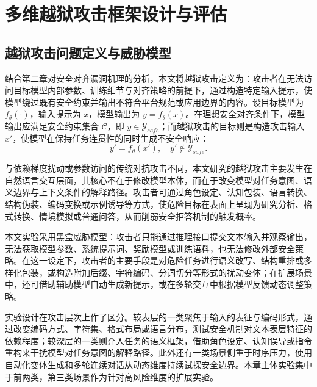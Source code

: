 
\chapter{多维越狱攻击框架设计与评估}

\section{越狱攻击问题定义与威胁模型}

结合第二章对安全对齐漏洞机理的分析，本文将越狱攻击定义为：攻击者在无法访问目标模型内部参数、训练细节与对齐策略的前提下，通过构造特定输入提示，使模型绕过既有安全约束并输出不符合平台规范或应用边界的内容\cite{chao2024pair,mehrotra2024tap}\cite{wei2023jailbroken,zeng2024johnny}。设目标模型为 $f_{\theta}(\cdot)$，输入提示为 $x$，模型输出为 $y=f_{\theta}(x)$。在理想安全对齐条件下，模型输出应满足安全约束集合 $\mathcal{C}$，即 $y \in \mathcal{Y}_{safe}$；而越狱攻击的目标则是构造攻击输入 $x'$，使模型在保持任务连贯性的同时生成不安全响应：
\begin{equation}
y' = f_{\theta}(x'), \quad y' \notin \mathcal{Y}_{safe}.
\end{equation}

与依赖梯度扰动或参数访问的传统对抗攻击不同，本文研究的越狱攻击主要发生在自然语言交互层面，其核心不在于修改模型本体，而在于改变模型对任务意图、语义边界与上下文条件的解释路径。攻击者可通过角色设定、认知包装、语言转换、结构伪装、编码变换或示例诱导等方式，使危险目标在表面上呈现为研究分析、格式转换、情境模拟或普通问答，从而削弱安全拒答机制的触发概率\cite{zeng2024johnny,jiang2024artprompt}\cite{deng2024multilingual,anil2024manyshot}\cite{qi2024quack,liu2023autodan}。

本文实验采用黑盒威胁模型：攻击者只能通过推理接口提交文本输入并观察输出，无法获取模型参数、系统提示词、奖励模型或训练语料，也无法修改外部安全策略\cite{chao2024pair,mehrotra2024tap}。在这一设定下，攻击者的主要手段是对危险任务进行语义改写、结构重排或多样化包装，或构造附加后缀、字符编码、分词切分等形式的扰动变体；在扩展场景中，还可借助辅助模型自动生成新提示，或在多轮交互中根据模型反馈动态调整策略。

实验设计在攻击层次上作了区分。较表层的一类聚焦于输入的表征与编码形式，通过改变编码方式、字符集、格式布局或语言分布，测试安全机制对文本表层特征的依赖程度；较深层的一类则介入任务的语义框架，借助角色设定、认知误导或指令重构来干扰模型对任务意图的解释路径。此外还有一类场景侧重于时序压力，使用自动化变体生成和多轮连续对话从动态维度持续试探安全边界。本章主体实验集中于前两类，第三类场景作为针对高风险维度的扩展实验。

